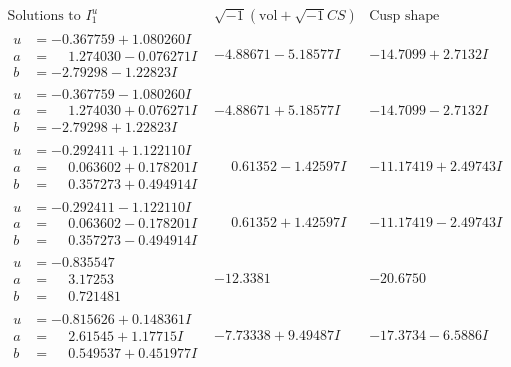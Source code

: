 \documentclass[1p]{elsarticle_modified}
\theoremstyle{definition}
\newcommand{\I}{\sqrt{-1}}
\begin{document}
$$\begin{array}{c|c|c}  
\text{Solutions to }I^u_{1}& \I (\text{vol} + \sqrt{-1}CS) & \text{Cusp shape}\\
 \hline 
\begin{aligned}
u &= -0.367759 + 1.080260 I \\
a &= \phantom{-}1.274030 - 0.076271 I \\
b &= -2.79298 - 1.22823 I\end{aligned}
 & -4.88671 - 5.18577 I & -14.7099 + 2.7132 I \\ \hline\begin{aligned}
u &= -0.367759 - 1.080260 I \\
a &= \phantom{-}1.274030 + 0.076271 I \\
b &= -2.79298 + 1.22823 I\end{aligned}
 & -4.88671 + 5.18577 I & -14.7099 - 2.7132 I \\ \hline\begin{aligned}
u &= -0.292411 + 1.122110 I \\
a &= \phantom{-}0.063602 + 0.178201 I \\
b &= \phantom{-}0.357273 + 0.494914 I\end{aligned}
 & \phantom{-}0.61352 - 1.42597 I & -11.17419 + 2.49743 I \\ \hline\begin{aligned}
u &= -0.292411 - 1.122110 I \\
a &= \phantom{-}0.063602 - 0.178201 I \\
b &= \phantom{-}0.357273 - 0.494914 I\end{aligned}
 & \phantom{-}0.61352 + 1.42597 I & -11.17419 - 2.49743 I \\ \hline\begin{aligned}
u &= -0.835547\phantom{ +0.000000I} \\
a &= \phantom{-}3.17253\phantom{ +0.000000I} \\
b &= \phantom{-}0.721481\phantom{ +0.000000I}\end{aligned}
 & -12.3381\phantom{ +0.000000I} & -20.6750\phantom{ +0.000000I} \\ \hline\begin{aligned}
u &= -0.815626 + 0.148361 I \\
a &= \phantom{-}2.61545 + 1.17715 I \\
b &= \phantom{-}0.549537 + 0.451977 I\end{aligned}
 & -7.73338 + 9.49487 I & -17.3734 - 6.5886 I \\ \hline\begin{aligned}

\end{aligned}
\end{array}$$
\end{document}
